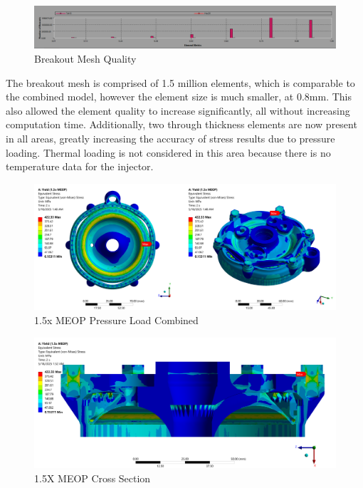  \begin{figure}
     \centering
     \includegraphics[width=1\linewidth]{Breakout Mesh Quality.png}
     \caption{Breakout Mesh Quality}
     \label{fig:Breakout Mesh Quality}
 \end{figure}
 The breakout mesh is comprised of 1.5 million elements, which is comparable to the combined model, however the element size is much smaller,  at 0.8mm. This also allowed the element quality to increase significantly, all without increasing computation time. Additionally, two through thickness elements are now present in all areas, greatly increasing the accuracy of stress results due to pressure loading. Thermal loading is not considered in this area because there is no temperature data for the injector.
\begin{figure}
    \centering
    \includegraphics[width=1\linewidth]{Images/1.5x MEOP Pressure Load Combined.png}
    \caption{1.5x MEOP Pressure Load Combined}
    \label{fig:1.5x MEOP Pressure Load Combined}
\end{figure}
 \begin{figure}
     \centering
     \includegraphics[width=1\linewidth]{Images/1.5X MEOP Cross Section.png}
     \caption{1.5X MEOP Cross Section}
     \label{fig:1.5X MEOP Cross Section}
 \end{figure}
